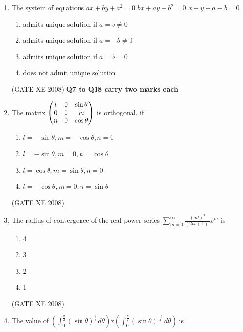 \documentclass[12pt]{article}
\begin{document}
\begin{enumerate}
\begin{enumerate}
\item  $-x$
\item  $\frac{x}{2}$
\item  $x$
\item $2x$
\end{enumerate}

(GATE XE 2008)
\item The system of equations \newline $ax+by+a^2=0$ \newline $bx+ay-b^2=0$ \newline $x+y+a-b=0$

\begin{enumerate}
\item  admits unique solution if $a=b\not =0$
\item admits unique solution if $a=-b\not=0$
\item admits unique solution if $a=b=0$
\item does not admit unique solution
\end{enumerate}

(GATE XE 2008)\newline
\textbf{Q7 to Q18 carry two marks each}
\item The matrix $\begin{pmatrix}l&0&\sin\theta\\0&1&m\\n&0&\cos\theta\end{pmatrix}$ is orthogonal, if

\begin{enumerate}
\item $l=-\sin\theta, m=-\cos\theta, n=0$
\item $l=-\sin\theta, m=0, n=\cos\theta$
\item $l=\cos\theta, m=\sin\theta, n=0$
\item $l=-\cos\theta, m=0, n=\sin\theta$
\end{enumerate}

(GATE XE 2008)
\item The radius of convergence of the real power series $\sum_{m=0}^{\infty} \frac{(m!)^2}{(2m+1)!} x^m$ is

\begin{enumerate}
\item 4
\item  3
\item 2
\item 1
\end{enumerate}

(GATE XE 2008)
\item The value of \newline$(\int_{0}^{\frac{\pi}{2}} (\sin\theta)^\frac{3}{4} \, d\theta)$x$(\int_{0}^{\frac{\pi}{2}} (\sin\theta)^\frac{-3}{4} \, d\theta)$ is


\end{enumerate}
\end{document}
